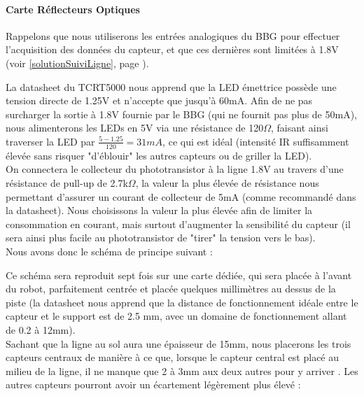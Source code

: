 		\paragraph{Carte Réflecteurs Optiques}\label{integrationReflecteurs}

			Rappelons que nous utiliserons les entrées analogiques du BBG pour effectuer l'acquisition des données du capteur, et que ces dernières sont limitées à 1.8V (voir \ref{solutionSuiviLigne}, page \pageref{solutionSuiviLigne}).

			La datasheet du TCRT5000 \cite{bib7} nous apprend que la LED émettrice possède une tension directe de 1.25V et n'accepte que jusqu'à 60mA.
			Afin de ne pas surcharger la sortie à 1.8V fournie par le BBG (qui ne fournit pas plus de 50mA), nous alimenterons les LEDs en 5V via une résistance de 120$\Omega$, faisant ainsi traverser la LED par $\frac{5-1.25}{120}=31mA$, ce qui est idéal (intensité IR suffisamment élevée sans risquer "d'éblouir" les autres capteurs ou de griller la LED).\\

			On connectera le collecteur du phototransistor à la ligne 1.8V au travers d'une résistance de pull-up de 2.7k$\Omega$, la valeur la plus élevée de résistance nous permettant d'assurer un courant de collecteur de 5mA (comme recommandé dans la datasheet). Nous choisissons la valeur la plus élevée afin de limiter la consommation en courant, mais surtout d'augmenter la sensibilité du capteur (il sera ainsi plus facile au phototransistor de "tirer" la tension vers le bas).\\

			Nous avons donc le schéma de principe suivant :

			Ce schéma sera reproduit sept fois sur une carte dédiée, qui sera placée à l'avant du robot, parfaitement centrée et placée quelques millimètres au dessus de la piste (la datasheet nous apprend que la distance de fonctionnement idéale entre le capteur et le support est de 2.5 mm, avec un domaine de fonctionnement allant de 0.2 à 12mm).\\
			
			Sachant que la ligne au sol aura une épaisseur de 15mm, nous placerons les trois capteurs centraux de manière à ce que, lorsque le capteur central est placé au milieu de la ligne, il ne manque que 2 à 3mm aux deux autres pour y arriver . Les autres capteurs pourront avoir un écartement légèrement plus élevé :

